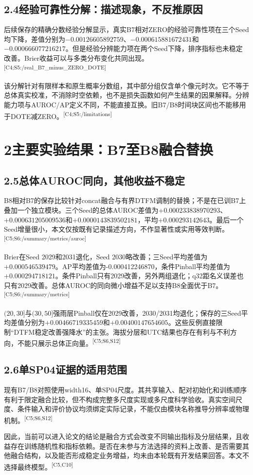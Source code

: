 \documentclass[UTF8,10.5pt,a4paper,fontset=none]{ctexart}
\newcommand{\evi}[1]{\textsuperscript{\textcolor{muted}{[#1]}}}
\newcommand{\nextpart}[1]{\clearpage\section*{#1}}
\begin{document}
\subsection*{2.4\quad 经验可靠性分解：描述现象，不反推原因}
后续保存的精确分数经验分解显示，真实B7相对ZERO的经验可靠性项在三个Seed均下降，差值分别为$-0.00126605892759$、$-0.000615881672431$和$-0.000666077216217$。但是经验分辨能力项在两个Seed下降，排序指标也未稳定改善。Brier收益可以与多类分布变化共同出现。\evi{C4;S5:/real\_B7\_minus\_ZERO\_DOTE}

该分解针对有限样本和原生概率分数组，其中部分组仅含单个像元时次。它不等于总体真实校准，不消除时空依赖，也不是损失函数如何产生结果的因果解释。分辨能力项与AUROC/AP定义不同，不能直接互换。旧B7/B8时间块区间也不能移用于DOTE减ZERO。\evi{C4;S5:/limitations}

\nextpart{2\quad 主要实验结果：B7至B8融合替换}
\subsection*{2.5\quad 总体AUROC同向，其他收益不稳定}
B8相对B7的保存比较针对concat融合与有界DTFM调制的替换；不是在已训B7上叠加一个独立模块。三个Seed的总体AUROC差值为$+0.000233838970293$、$+0.000631205009536$和$+0.0000143839502181$，平均$+0.000293142643$。最后一个Seed增量很小，本文仅按既有记录描述方向，不作显著性或实用等效判断。\evi{C5;S6:/summary/metrics/auroc}

Brier在Seed 2029和2031退化，Seed 2030略改善；三Seed平均差值为$+0.000546539479$。AP平均差值为-0.000412246870，条件Pinball平均差值为$+0.000294718121$。条件Pinball只有2029改善，另外两组退化；q32距名义误差也只有2029改善。总体AUROC的同向微小增益不足以支持B8全面优于B7。\evi{C5;S6:/summary/metrics}

$(20,30]$与$(30,50]$强雨层Pinball仅在2029改善，2030/2031均退化；保存的三Seed平均差值分别为$+0.00466719335459$和$+0.00400147654605$。这些反例直接限制“DTFM稳定改善强降水”的主张。海拔分层和UTC结果也存在有利与不利方向，不能只展示总体正向量。\evi{C5;S6,S12}

\subsection*{2.6\quad 单SP04证据的适用范围}
现有B7/B8对照使用width16、单SP04尺度。其共享输入、配对初始化和训练顺序有利于限定融合比较，但不构成完整多尺度实现或多尺度科学验收。真实空间尺度、条件输入和评价协议均须绑定实际记录，不能仅由模块名称推导分辨率或物理机制。\evi{C5;S6,S12}

因此，当前可以进入论文的结论是融合方式会改变不同输出指标及分层结果，且收益存在训练随机性和指标依赖。是否在未参与方法选择的资料上改善、是否需要其他融合结构，以及能否形成稳定业务增益，均未由本轮既有开发结果回答。本文不选择最终模型。\evi{C5,C10}
\end{document}
